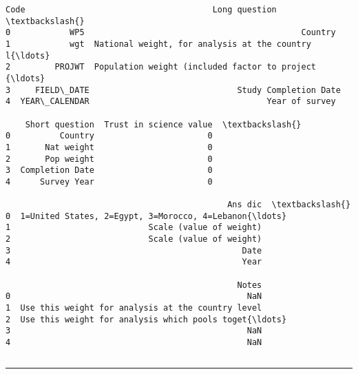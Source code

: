 \documentclass[11pt]{article}
\makeatletter
\newcommand{\boxspacing}{\kern\kvtcb@left@rule\kern\kvtcb@boxsep}
\newcommand{\prompt}[4]{
        {\ttfamily\llap{{\color{#2}[#3]:\hspace{3pt}#4}}\vspace{-\baselineskip}}
    }
\makeatother
\begin{document}
            \begin{tcolorbox}[breakable, size=fbox, boxrule=.5pt, pad at break*=1mm, opacityfill=0]
\prompt{Out}{outcolor}{7}{\boxspacing}
\begin{Verbatim}[commandchars=\\\{\}]
            Code                                      Long question  \textbackslash{}
0            WP5                                            Country
1            wgt  National weight, for analysis at the country l{\ldots}
2         PROJWT  Population weight (included factor to project {\ldots}
3     FIELD\_DATE                              Study Completion Date
4  YEAR\_CALENDAR                                    Year of survey

    Short question  Trust in science value  \textbackslash{}
0          Country                       0
1       Nat weight                       0
2       Pop weight                       0
3  Completion Date                       0
4      Survey Year                       0

                                             Ans dic  \textbackslash{}
0  1=United States, 2=Egypt, 3=Morocco, 4=Lebanon{\ldots}
1                            Scale (value of weight)
2                            Scale (value of weight)
3                                               Date
4                                               Year

                                               Notes
0                                                NaN
1  Use this weight for analysis at the country level
2  Use this weight for analysis which pools toget{\ldots}
3                                                NaN
4                                                NaN
\end{Verbatim}
\end{tcolorbox}
        
    \begin{tcolorbox}[breakable, size=fbox, boxrule=1pt, pad at break*=1mm,colback=cellbackground, colframe=cellborder]
\prompt{In}{incolor}{ }{\boxspacing}
\begin{Verbatim}[commandchars=\\\{\}]

\end{Verbatim}
\end{tcolorbox}

    \begin{center}\rule{0.5\linewidth}{0.5pt}\end{center}
\end{document}
